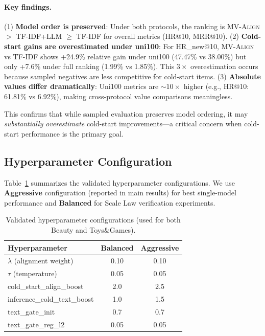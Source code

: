 \documentclass[sigconf,natbib=true]{acmart}
\newcommand{\model}{\textsc{MV-Align}\xspace}
\begin{document}
\paragraph{Key findings.}
(1) \textbf{Model order is preserved}: Under both protocols, the ranking is \model $>$ TF-IDF+LLM $\geq$ TF-IDF for overall metrics (HR@10, MRR@10).
(2) \textbf{Cold-start gains are overestimated under uni100}: For HR\_new@10, \model vs TF-IDF shows +24.9\% relative gain under uni100 (47.47\% vs 38.00\%) but only +7.6\% under full ranking (1.99\% vs 1.85\%). This $3\times$ overestimation occurs because sampled negatives are less competitive for cold-start items.
(3) \textbf{Absolute values differ dramatically}: Uni100 metrics are ${\sim}10\times$ higher (e.g., HR@10: 61.81\% vs 6.92\%), making cross-protocol value comparisons meaningless.

This confirms that while sampled evaluation preserves model ordering, it may \emph{substantially overestimate} cold-start improvements---a critical concern when cold-start performance is the primary goal.

\subsection{Hyperparameter Configuration}
\label{app:hyper}
Table~\ref{tab:hyper_config} summarizes the validated hyperparameter configurations.
We use \textbf{Aggressive} configuration (reported in main results) for best single-model performance
and \textbf{Balanced} for Scale Law verification experiments.

\begin{table}[t]
\caption{Validated hyperparameter configurations (used for both Beauty and Toys\&Games).}
\label{tab:hyper_config}
\centering
\small
\begin{tabular}{lcc}
\toprule
\textbf{Hyperparameter} & \textbf{Balanced} & \textbf{Aggressive} \\
\midrule
$\lambda$ (alignment weight) & 0.10 & 0.10 \\
$\tau$ (temperature) & 0.05 & 0.05 \\
cold\_start\_align\_boost & 2.0 & 2.5 \\
inference\_cold\_text\_boost & 1.0 & 1.5 \\
text\_gate\_init & 0.7 & 0.7 \\
text\_gate\_reg\_l2 & 0.05 & 0.05 \\
\bottomrule
\end{tabular}
\end{table}
\end{document}
